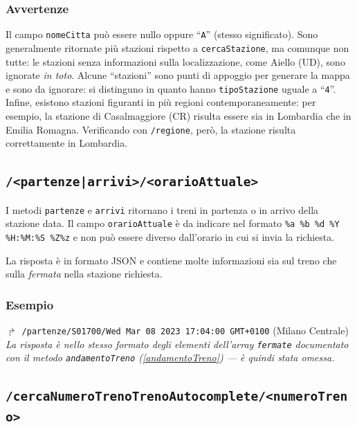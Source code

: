 \documentclass[12pt,italian]{report}
\begin{document}
\subsubsection{Avvertenze}

Il campo \texttt{nomeCitta} può essere nullo oppure ``\texttt{A}''
(stesso significato).  Sono generalmente ritornate più stazioni
rispetto a \texttt{cercaStazione}, ma comunque non tutte: le stazioni
senza informazioni sulla localizzazione, come Aiello (UD), sono
ignorate \textit{in toto}.  Alcune ``stazioni'' sono punti di appoggio
per generare la mappa e sono da ignorare: si distinguno in quanto
hanno \texttt{tipoStazione} uguale a ``\texttt{4}''.  Infine, esistono
stazioni figuranti in più regioni contemporaneamente: per esempio, la
stazione di Casalmaggiore (CR) risulta essere sia in Lombardia che in
Emilia Romagna.  Verificando con \texttt{/regione}, però, la stazione
risulta correttamente in Lombardia.

\subsection{\texttt{/<partenze|arrivi>/<orarioAttuale>}}
\label{partenzeArrivi}

I metodi \texttt{partenze} e \texttt{arrivi} ritornano i treni in
partenza o in arrivo della stazione data.  Il campo
\texttt{orarioAttuale} è da indicare nel formato \texttt{\%a \%b \%d
    \%Y \%H:\%M:\%S \%Z\%z} e non può essere diverso dall'orario in
cui si invia la richiesta.

La risposta è in formato JSON e contiene molte informazioni sia sul
treno che sulla \textit{fermata} nella stazione richiesta.

\subsubsection{Esempio}

$\Rsh$ \texttt{/partenze/S01700/Wed Mar 08 2023 17:04:00 GMT+0100}
\hfill (Milano Centrale) \\

\noindent \textit{La risposta è nello stesso formato degli elementi
    dell'array \texttt{fermate} documentato con il metodo
    \texttt{andamentoTreno} (\ref{andamentoTreno}) --- è quindi stata
    omessa.}

\subsection{\texttt{/cercaNumeroTrenoTrenoAutocomplete/<numeroTreno>}}
\label{trenoAutocomplete}
\end{document}

